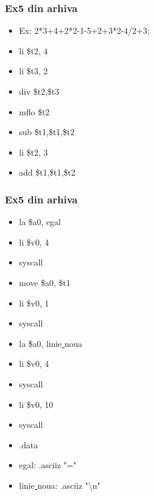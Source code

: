\documentclass[pdf]{beamer}
\begin{document}
\begin{frame}
\frametitle{Ex5 din arhiva}
\begin{itemize}
\item  
Ex: 2*3+4+2*2-1-5+2+3*2-4/2+3;
\item \quad
	li \hspace{10mm} \$t2, 4
\item \quad
	li \hspace{10mm} \$t3, 2
\item \quad
	div \hspace{8.5mm}\$t2,\$t3
\item \quad \vspace{5mm}
	mflo \hspace{4.7mm} \$t2
\item \quad \vspace{5mm}
	sub \hspace{6.5mm} \$t1,\$t1,\$t2
\item \quad 
	li \hspace{10mm} \$t2, 3
\item \quad
	add \hspace{6mm} \$t1,\$t1,\$t2
\end{itemize}
\end{frame}



\begin{frame}[shrink=20]
\frametitle{Ex5 din arhiva}
\begin{itemize}
\item  \quad
    la \hspace{13.2mm}	\$a0, egal
\item  \quad
	li \hspace{14mm}	\$v0, 4
\item  \quad \vspace{5mm}
	syscall
\item  \quad 
	move \hspace{7.5mm} \$a0, \$t1
\item \quad
	li \hspace{14mm} \$v0, 1
\item \quad \vspace{5mm}
	syscall
\item \quad
	la \hspace{13.2mm} \$a0, linie\underline{ }noua
\item \quad
	li \hspace{14mm} \$v0, 4
\item \quad \vspace{5mm}
	syscall
\item \quad
	li \hspace{14mm} \$v0, 10
\item \quad \vspace{5mm}
	syscall
\item \quad
	.data
\item 
egal: \hspace{11mm} .asciiz	"="
\item 
linie\underline{ }noua: \hspace{2mm}	.asciiz	"\textbackslash{n}"
\end{itemize}
\end{frame}
\end{document}
